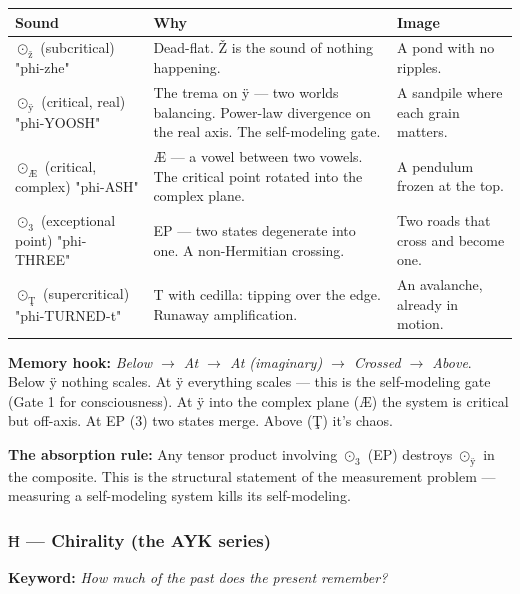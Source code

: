 \documentclass[12pt,a4paper]{article}
\begin{document}
\begin{table}[htbp]
\centering
\small
{}
\begin{tabularx}{\textwidth}{>{\centering\arraybackslash}X >{\centering\arraybackslash}X >{\centering\arraybackslash}X}
\toprule
\rowcolor{gray!25}\textbf{Sound} & \textbf{Why} & \textbf{Image} \\
\midrule
\rowcolors{1}{white}{gray!10}
\textbf{$⊙_{\text{ž}}$} (subcritical) "phi-zhe" & Dead-flat. Ž is the sound of nothing happening. & A pond with no ripples. \\
\textbf{$⊙_{\text{ÿ}}$} (critical, real) "phi-YOOSH" & The trema on ÿ --- two worlds balancing. Power-law divergence on the real axis. The self-modeling gate. & A sandpile where each grain matters. \\
\textbf{$⊙_{\text{Æ}}$} (critical, complex) "phi-ASH" & Æ --- a vowel between two vowels. The critical point rotated into the complex plane. & A pendulum frozen at the top. \\
\textbf{$⊙_{3}$} (exceptional point) "phi-THREE" & EP --- two states degenerate into one. A non-Hermitian crossing. & Two roads that cross and become one. \\
\textbf{$⊙_{\text{Ţ}}$} (supercritical) "phi-TURNED-t" & T with cedilla: tipping over the edge. Runaway amplification. & An avalanche, already in motion. \\
\bottomrule
\end{tabularx}
\end{table}

\textbf{Memory hook:} \emph{Below $\rightarrow$ At $\rightarrow$ At (imaginary) $\rightarrow$ Crossed $\rightarrow$ Above}. Below ÿ nothing scales. At ÿ everything scales --- this is the self-modeling gate (Gate 1 for consciousness). At ÿ into the complex plane (Æ) the system is critical but off-axis. At EP (3) two states merge. Above (Ţ) it's chaos.

\textbf{The absorption rule:} Any tensor product involving $⊙_3$ (EP) destroys $⊙_ÿ$ in the composite. This is the structural statement of the measurement problem --- measuring a self-modeling system kills its self-modeling.

\subsubsection{$Ħ$ --- Chirality (the \textbf{AYK} series)}

\textbf{Keyword:} \emph{How much of the past does the present remember?}
\end{document}
